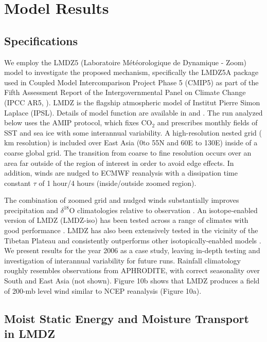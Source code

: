 \section{Model Results}

\subsection{Specifications}
	
	We employ the LMDZ5 (Laboratoire M\'et\'eorologique de Dynamique - Zoom) model to investigate the proposed mechanism, specifically the LMDZ5A package used in Coupled Model Intercomparison Project Phase 5 (CMIP5) as part of the Fifth Assessment Report of the Intergovernmental Panel on Climate Change (IPCC AR5, \cite{Christensen2011}). LMDZ is the flagship atmospheric model of Institut Pierre Simon Laplace (IPSL). Details of model function are available in \cite{Hourdin2006} and \cite{Hourdin2012}. The run analyzed below uses the AMIP protocol, which fixes CO$_\mathrm{2}$ and prescribes monthly fields of SST and sea ice with some interannual variability. A high-resolution nested grid ( km resolution) is included over East Asia (0\textdegree to 55\textdegree N and 60\textdegree E to 130\textdegree E) inside of a coarse global grid. The transition from coarse to fine resolution occurs over an area far outside of the region of interest in order to avoid edge effects. In addition, winds are nudged to ECMWF reanalysis with a dissipation time constant $\tau$ of 1 hour/4 hours (inside/outside zoomed region). 
	
	The combination of zoomed grid and nudged winds substantially improves precipitation and $\delta^{18}$O climatologies relative to observation \citep{Gao2011}. An isotope-enabled version of LMDZ (LMDZ-iso) has been tested across a range of climates with good performance \citep{Risi2010}. LMDZ has also been extensively tested in the vicinity of the Tibetan Plateau and consistently outperforms other isotopically-enabled models \citep{Gao2011,Lee2012,Eagle2013,Gao2013,Yao2013}. We present results for the year 2006 as a case study, leaving in-depth testing and investigation of interannual variability for future runs. Rainfall climatology roughly resembles observations from APHRODITE, with correct seasonality over South and East Asia (not shown). Figure 10b shows that LMDZ produces a field of 200-mb level wind similar to NCEP reanalysis (Figure 10a).
	
\subsection{Moist Static Energy and Moisture Transport in LMDZ}
	
